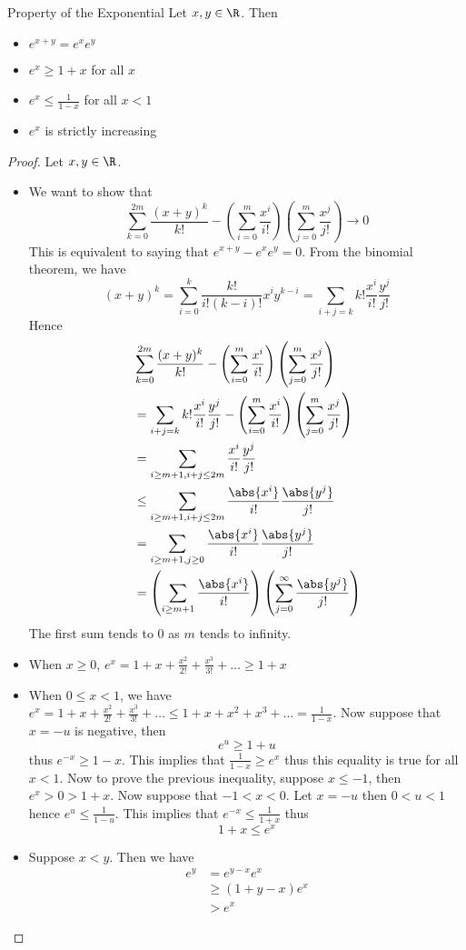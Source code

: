 \begin{thm}{Property of the Exponential}{} Let $x,y\in\R$. Then 
\begin{itemize}
\item $e^{x+y}=e^xe^y$
\item $e^x\geq 1+x$ for all $x$
\item $e^x\leq\frac{1}{1-x}$ for all $x<1$
\item $e^x$ is strictly increasing
\end{itemize}\tcbline
\begin{proof} Let $x,y\in\R$. 
\begin{itemize}
\item We want to show that $$\sum_{k=0}^{2m}\frac{(x+y)^k}{k!}-\left(\sum_{i=0}^m\frac{x^i}{i!}\right)\left(\sum_{j=0}^m\frac{x^j}{j!}\right)\to0$$ This is equivalent to saying that $e^{x+y}-e^xe^y=0$. From the binomial theorem, we have $$(x+y)^k=\sum_{i=0}^k\frac{k!}{i!(k-i)!}x^iy^{k-i}=\sum_{i+j=k}k!\frac{x^i}{i!}\frac{y^j}{j!}$$ Hence
\begin{align*}
&\sum_{k=0}^{2m}\frac{(x+y)^k}{k!}-\left(\sum_{i=0}^m\frac{x^i}{i!}\right)\left(\sum_{j=0}^m\frac{x^j}{j!}\right)\\
&=\sum_{i+j=k}k!\frac{x^i}{i!}\frac{y^j}{j!}-\left(\sum_{i=0}^m\frac{x^i}{i!}\right)\left(\sum_{j=0}^m\frac{x^j}{j!}\right)\\
&=\sum_{i\geq m+1,i+j\leq 2m}\frac{x^i}{i!}\frac{y^j}{j!}\\
&\leq\sum_{i\geq m+1,i+j\leq 2m}\frac{\abs{x^i}}{i!}\frac{\abs{y^j}}{j!}\\
&=\sum_{i\geq m+1,j\geq0}\frac{\abs{x^i}}{i!}\frac{\abs{y^j}}{j!}\\
&=\left(\sum_{i\geq m+1}\frac{\abs{x^i}}{i!}\right)\left(\sum_{j=0}^\infty\frac{\abs{y^j}}{j!}\right)
\end{align*} The first sum tends to $0$ as $m$ tends to infinity. 
\item When $x\geq0$, $e^x=1+x+\frac{x^2}{2!}+\frac{x^3}{3!}+\dots\geq 1+x$
\item When $0\leq x<1$, we have $e^x=1+x+\frac{x^2}{2!}+\frac{x^3}{3!}+\dots\leq1+x+x^2+x^3+\dots=\frac{1}{1-x}$. Now suppose that $x=-u$ is negative, then $$e^u\geq1+u$$ thus $e^{-x}\geq1-x$. This implies that $\frac{1}{1-x}\geq e^x$ thus this equality is true for all $x<1$. Now to prove the previous inequality, suppose $x\leq-1$, then $e^x>0>1+x$. Now suppose that $-1<x<0$. Let $x=-u$ then $0<u<1$ hence $e^u\leq\frac{1}{1-u}$. This implies that $e^{-x}\leq\frac{1}{1+x}$ thus $$1+x\leq e^x$$
\item Suppose $x<y$. Then we have
\begin{align*}
e^y&=e^{y-x}e^x\\
&\geq(1+y-x)e^x\\
&>e^x
\end{align*}
\end{itemize}
\end{proof}
\end{thm}


